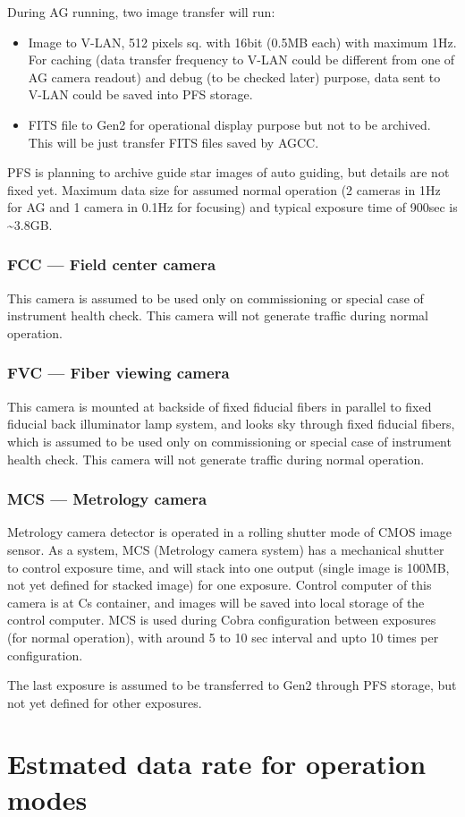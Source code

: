 \documentclass[a4paper,notitlepage]{article}
\begin{document}
During AG running, two image transfer will run: 
\begin{itemize}
  \item Image to V-LAN, 512 pixels sq. with 16bit (0.5MB each) with maximum 1Hz.
    For caching (data transfer frequency to V-LAN could be different from one 
    of AG camera readout) and debug (to be checked later) purpose, data sent 
    to V-LAN could be saved into PFS storage. 
  \item FITS file to Gen2 for operational display purpose but not to be 
    archived. This will be just transfer FITS files saved by AGCC. 
\end{itemize}

PFS is planning to archive guide star images of auto guiding, but details are 
not fixed yet. Maximum data size for assumed normal operation (2 cameras in 
1Hz for AG and 1 camera in 0.1Hz for focusing) and typical exposure time of 
900sec is \~{}3.8GB. 


\subsubsection{FCC --- Field center camera}

This camera is assumed to be used only on commissioning or special case of 
instrument health check.
This camera will not generate traffic during normal operation. 


\subsubsection{FVC --- Fiber viewing camera}

This camera is mounted at backside of fixed fiducial fibers in parallel to 
fixed fiducial back illuminator lamp system, and looks sky through fixed 
fiducial fibers, which is assumed to be used only on commissioning or special 
case of instrument health check. 
This camera will not generate traffic during normal operation. 

\subsubsection{MCS --- Metrology camera}

Metrology camera detector is operated in a rolling shutter mode of CMOS image 
sensor. As a system, MCS (Metrology camera system) has a mechanical shutter 
to control exposure time, and will stack into one output (single image is 
100MB, not yet defined for stacked image) for one exposure. 
Control computer of this camera is at Cs container, and images will be saved 
into local storage of the control computer. MCS is used during Cobra 
configuration between exposures (for normal operation), with around 5 to 10 sec 
interval and upto 10 times per configuration. 

The last exposure is assumed to be transferred to Gen2 through PFS storage, 
but not yet defined for other exposures. 


\section{Estmated data rate for operation modes}
\end{document}
